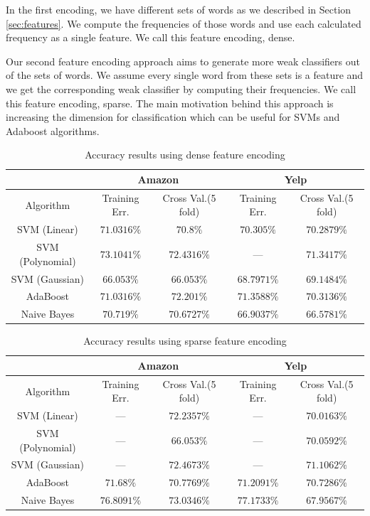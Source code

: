 \documentclass[letterpaper]{article}
\begin{document}
In the first encoding, we have different sets of words as we described in
Section \ref{sec:features}. We compute the frequencies of those
words and use each calculated frequency as a single feature. We call
this feature encoding, dense. 

Our second feature encoding approach aims to generate more weak classifiers out of the sets
of words. We assume every single word from these sets is a feature and
we get the corresponding weak classifier by computing their
frequencies. We call this feature encoding, sparse. The main
motivation behind this approach is increasing the dimension for
classification which can be useful for SVMs and Adaboost algorithms.

\begin{table}[ht]
\centering
\begin{tabular}{c | c c | c c}
 & \multicolumn{2}{|c|}{Amazon} & \multicolumn{2}{|c}{Yelp} \\
\hline
Algorithm & Training Err. & Cross Val.(5 fold) & Training Err. & Cross Val.(5 fold)\\
\hline
SVM (Linear) 		& $71.0316\%$ & $70.8\%$ & $70.305\%$ & $70.2879\%$\\
SVM (Polynomial) 	& $73.1041\%$ & $72.4316\%$ & --- & $71.3417\%$\\
SVM (Gaussian) 		& $66.053\%$ & $66.053\%$ & $68.7971\%$ & $69.1484\%$\\
AdaBoost 			& $71.0316\%$ & $72.201\%$ & $71.3588\%$ & $70.3136\%$\\ 
Naive Bayes 		& $70.719\%$ & $70.6727\%$ & $66.9037\%$ & $66.5781\%$\\ 
\end{tabular}
\caption{Accuracy results using dense feature encoding}
\label{tab:dense}
\end{table}


\begin{table}[ht]
\centering
\begin{tabular}{c | c c | c c}
 & \multicolumn{2}{|c|}{Amazon} & \multicolumn{2}{|c}{Yelp} \\
\hline
Algorithm & Training Err. & Cross Val.(5 fold) & Training Err. & Cross Val.(5 fold)\\
\hline
SVM (Linear) 		& --- & $72.2357\%$ 		& --- & $70.0163\%$\\
SVM (Polynomial) 	& --- & $66.053\%$ 		& --- & $70.0592\%$\\
SVM (Gaussian) 		& --- & $72.4673\%$ 		& --- & $71.1062\%$\\
AdaBoost 			& $71.68\%$   & $70.7769\%$ & $71.2091\%$ & $70.7286\%$\\ 
Naive Bayes 		& $76.8091\%$ & $73.0346\%$ & $77.1733\%$ & $67.9567\%$\\ 
\end{tabular}
\caption{Accuracy results using sparse feature encoding}
\label{tab:sparse}
\end{table}
\end{document}
